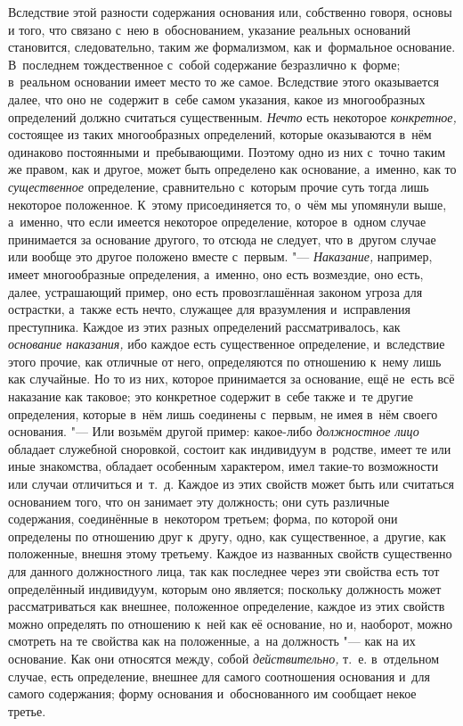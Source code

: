 Вследствие этой разности содержания основания или, собственно говоря, основы и
того, что связано с~нею в~обоснованием, указание реальных оснований становится,
следовательно, таким же формализмом, как и~формальное основание. В~последнем
тождественное с~собой содержание безразлично к~форме; в~реальном основании
имеет место то же самое. Вследствие этого оказывается далее, что оно
не~содержит в~себе самом указания, какое из многообразных определений должно
считаться существенным. {\em Нечто} есть некоторое {\em конкретное,} состоящее
из таких многообразных определений, которые оказываются в~нём одинаково
постоянными и~пребывающими. Поэтому одно из них с~точно таким же правом, как и
другое, может быть определено как основание, а~именно, как то
{\em существенное} определение, сравнительно с~которым прочие суть тогда лишь
некоторое положенное. К~этому присоединяется то, о~чём мы упомянули выше,
а~именно, что если имеется некоторое определение, которое в~одном случае
принимается за основание другого, то отсюда не следует, что в~другом случае или
вообще это другое положено вместе с~первым. "--- {\em Наказание,} например,
имеет многообразные определения, а~именно, оно есть возмездие, оно есть, далее,
устрашающий пример, оно есть провозглашённая законом угроза для острастки,
а~также есть нечто, служащее для вразумления и~исправления преступника. Каждое
из этих разных определений рассматривалось, как {\em основание наказания,} ибо
каждое есть существенное определение, и~вследствие этого прочие, как отличные
от него, определяются по отношению к~нему лишь как случайные. Но то из них,
которое принимается за основание, ещё не~есть всё наказание как таковое; это
конкретное содержит в~себе также и~те другие определения, которые в~нём лишь
соединены с~первым, не имея в~нём своего основания. "--- Или возьмём другой
пример: какое-либо {\em должностное лицо} обладает служебной сноровкой, состоит
как индивидуум в~родстве, имеет те или иные знакомства, обладает особенным
характером, имел такие-то возможности или случаи отличиться и~т.~д. Каждое из
этих свойств может быть или считаться основанием того, что он занимает эту
должность; они суть различные содержания, соединённые в~некотором третьем;
форма, по которой они определены по отношению друг к~другу, одно, как
существенное, а~другие, как положенные, внешня этому третьему. Каждое из
названных свойств существенно для данного должностного лица, так как последнее
через эти свойства есть тот определённый индивидуум, которым оно является;
поскольку должность может рассматриваться как внешнее, положенное определение,
каждое из этих свойств можно определять по отношению к~ней как её основание, но
и, наоборот, можно смотреть на те свойства как на положенные, а~на должность
"--- как на их основание. Как они относятся между, собой {\em действительно,}
т.~е. в~отдельном случае, есть определение, внешнее для самого соотношения
основания и~для самого содержания; форму основания и~обоснованного им сообщает
некое третье.


